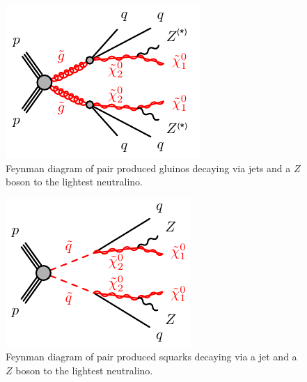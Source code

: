 \begin{centering}
\begin{figure}[!hbt]
\myfloatalign
\includegraphics[width=.9\linewidth]{figures/theory/gogo-qqqqZZN1N1.pdf}
\caption{Feynman diagram of pair produced gluinos decaying via jets and a $Z$ boson to the lightest neutralino.}
\label{fig:simpmodel}
\end{figure}
\end{centering}

\begin{centering}
\begin{figure}[!hbt]
\myfloatalign
\includegraphics[width=.9\linewidth]{figures/theory/sqsq-qqZZN1N1.pdf}
\caption{Feynman diagram of pair produced squarks decaying via a jet and a $Z$ boson to the lightest neutralino.}
\label{fig:simpmodel2}
\end{figure}
\end{centering}

